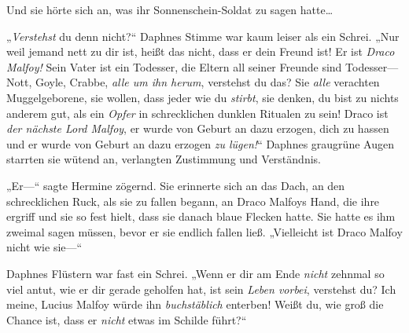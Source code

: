 Und sie hörte sich an, was ihr Sonnenschein-Soldat zu sagen hatte…

„\emph{Verstehst} du denn nicht?“ Daphnes Stimme war kaum leiser als ein Schrei. „Nur weil jemand nett zu dir ist, heißt das nicht, dass er dein Freund ist! Er ist \emph{Draco Malfoy!} Sein Vater ist ein Todesser, die Eltern all seiner Freunde sind Todesser—Nott, Goyle, Crabbe, \emph{alle um ihn herum}, verstehst du das? Sie \emph{alle} verachten Muggelgeborene, sie wollen, dass jeder wie du \emph{stirbt}, sie denken, du bist zu nichts anderem gut, als ein \emph{Opfer} in schrecklichen dunklen Ritualen zu sein! Draco ist \emph{der nächste Lord Malfoy}, er wurde von Geburt an dazu erzogen, dich zu hassen und er wurde von Geburt an dazu erzogen \emph{zu lügen!}“ Daphnes graugrüne Augen starrten sie wütend an, verlangten Zustimmung und Verständnis.

„Er—“ sagte Hermine zögernd. Sie erinnerte sich an das Dach, an den schrecklichen Ruck, als sie zu fallen begann, an Draco Malfoys Hand, die ihre ergriff und sie so fest hielt, dass sie danach blaue Flecken hatte. Sie hatte es ihm zweimal sagen müssen, bevor er sie endlich fallen ließ. „Vielleicht ist Draco Malfoy nicht wie sie—“

Daphnes Flüstern war fast ein Schrei. „Wenn er dir am Ende \emph{nicht} zehnmal so viel antut, wie er dir gerade geholfen hat, ist sein \emph{Leben vorbei}, verstehst du? Ich meine, Lucius Malfoy würde ihn \emph{buchstäblich} enterben! Weißt du, wie groß die Chance ist, dass er \emph{nicht} etwas im Schilde führt?“

